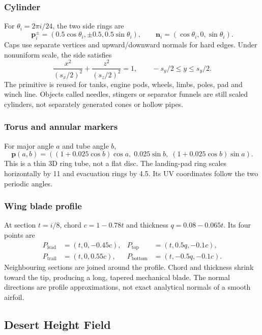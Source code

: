 \subsubsection{Cylinder}
For $\theta_i=2\pi i/24$, the two side rings are
\begin{equation}
\mathbf p_i^\pm=(0.5\cos\theta_i,\pm0.5,0.5\sin\theta_i),\qquad
\mathbf n_i=(\cos\theta_i,0,\sin\theta_i).
\end{equation}
Caps use separate vertices and upward/downward normals for hard edges. Under nonuniform scale, the side satisfies
\begin{equation}
\frac{x^2}{(s_x/2)^2}+\frac{z^2}{(s_z/2)^2}=1,\qquad -s_y/2\le y\le s_y/2.
\end{equation}
The primitive is reused for tanks, engine pods, wheels, limbs, poles, pad and winch line. Objects called needles, stingers or separator funnels are still scaled cylinders, not separately generated cones or hollow pipes.

\subsubsection{Torus and annular markers}
For major angle $a$ and tube angle $b$,
\begin{equation}
\mathbf p(a,b)=((1+0.025\cos b)\cos a,\;0.025\sin b,\;(1+0.025\cos b)\sin a).
\end{equation}
This is a thin 3D ring tube, not a flat disc. The landing-pad ring scales horizontally by 11 and evacuation rings by 4.5. Its UV coordinates follow the two periodic angles.

\subsubsection{Wing blade profile}
At section $t=i/8$, chord $c=1-0.78t$ and thickness $q=0.08-0.065t$. Its four points are
\begin{align}
P_{\mathrm{lead}}&=(t,0,-0.45c),&P_{\mathrm{top}}&=(t,0.5q,-0.1c),\\
P_{\mathrm{trail}}&=(t,0,0.55c),&P_{\mathrm{bottom}}&=(t,-0.5q,-0.1c).
\end{align}
Neighbouring sections are joined around the profile. Chord and thickness shrink toward the tip, producing a long, tapered mechanical blade. The normal directions are profile approximations, not exact analytical normals of a smooth airfoil.

\subsection{Desert Height Field}
